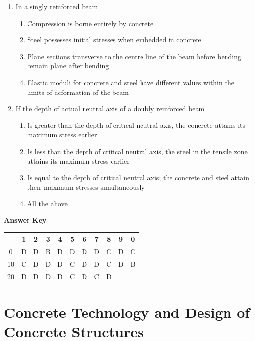 \documentclass[11pt,a4paper]{article}
\begin{document}
\begin{enumerate}
\item{In a singly reinforced beam}
\begin{enumerate}[label=\Alph*.]
\item{Compression is borne entirely by concrete}
\item{Steel possesses initial stresses when embedded in concrete}
\item{Plane sections transverse to the centre line of the beam before bending remain plane after bending}
\item{Elastic moduli for concrete and steel have different values within the limits of deformation of the beam}
\end{enumerate}
\item{If the depth of actual neutral axis of a doubly reinforced beam}
\begin{enumerate}[label=\Alph*.]
\item{Is greater than the depth of critical neutral axis, the concrete attains its maximum stress earlier}
\item{Is less than the depth of critical neutral axis, the steel in the tensile zone attains its maximum stress earlier}
\item{Is equal to the depth of critical neutral axis; the concrete and steel attain their maximum stresses simultaneously}
\item{All the above}
\end{enumerate}
\end{enumerate}
\textbf{Answer Key}
\begin{tabular}{ | c | c c c c c c c c c c | }
\hline
 & 1 & 2 & 3 & 4 & 5 & 6 & 7 & 8 & 9 & 0 \\
\hline
0 & D & D & B & D & D & D & D & C & D & C \\
10 & C & D & D & D & C & D & D & C & D & B \\
20 & D & D & D & D & C & D & C & D &   &   \\
\hline
\end{tabular}
\clearpage
\section{Concrete Technology and Design of Concrete Structures}
\end{document}
